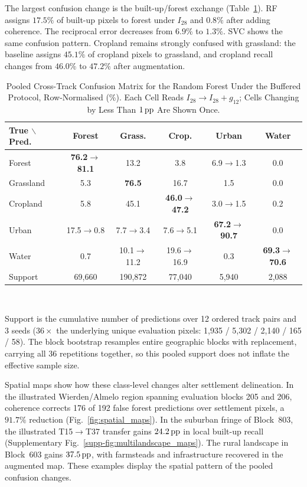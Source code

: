 The largest confusion change is the built-up/forest exchange (Table~\ref{tab:confusion}). RF assigns $17.5\%$ of built-up pixels to forest under $I_{28}$ and $0.8\%$ after adding coherence. The reciprocal error decreases from $6.9\%$ to $1.3\%$. SVC shows the same confusion pattern. Cropland remains strongly confused with grassland: the baseline assigns $45.1\%$ of cropland pixels to grassland, and cropland recall changes from $46.0\%$ to $47.2\%$ after augmentation.

\begin{table}[!t]
\caption{Pooled Cross-Track Confusion Matrix for the Random Forest Under the Buffered Protocol, Row-Normalised (\%).
Each Cell Reads $I_{28} \rightarrow I_{28}+g_{12}$; Cells Changing by Less Than $1\,\mathrm{pp}$ Are Shown Once.}
\label{tab:confusion}
\centering
\scriptsize
\setlength{\tabcolsep}{2.5pt}
\begin{tabular}{lccccc}
\toprule
True $\backslash$ Pred. & Forest & Grass. & Crop. & Urban & Water \\
\midrule
Forest & \textbf{76.2$\to$81.1} & 13.2 & 3.8 & 6.9$\to$1.3 & 0.0 \\
Grassland & 5.3 & \textbf{76.5} & 16.7 & 1.5 & 0.0 \\
Cropland & 5.8 & 45.1 & \textbf{46.0$\to$47.2} & 3.0$\to$1.5 & 0.2 \\
Urban & 17.5$\to$0.8 & 7.7$\to$3.4 & 7.6$\to$5.1 & \textbf{67.2$\to$90.7} & 0.0 \\
Water & 0.7 & 10.1$\to$11.2 & 19.6$\to$16.9 & 0.3 & \textbf{69.3$\to$70.6} \\
\midrule
Support & 69{,}660 & 190{,}872 & 77{,}040 & 5{,}940 & 2{,}088 \\
\bottomrule
\end{tabular}
\\[2pt]
\parbox{\columnwidth}{\footnotesize Support is the cumulative number of predictions over 12 ordered track pairs and 3 seeds ($36\times$ the underlying unique evaluation pixels: 1{,}935 / 5{,}302 / 2{,}140 / 165 / 58). The block bootstrap resamples entire geographic blocks with replacement, carrying all 36 repetitions together, so this pooled support does not inflate the effective sample size.}
\end{table}

Spatial maps show how these class-level changes alter settlement delineation. In the illustrated Wierden/Almelo region spanning evaluation blocks 205 and 206, coherence corrects 176 of 192 false forest predictions over settlement pixels, a $91.7\%$ reduction (Fig.~\ref{fig:spatial_maps}). In the suburban fringe of Block~803, the illustrated T15$\to$T37 transfer gains $24.2\,\mathrm{pp}$ in local built-up recall (Supplementary Fig.~\ref{supp-fig:multilandscape_maps}). The rural landscape in Block~603 gains $37.5\,\mathrm{pp}$, with farmsteads and infrastructure recovered in the augmented map. These examples display the spatial pattern of the pooled confusion changes.

